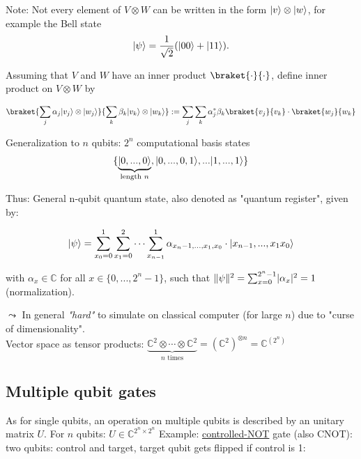 Note: Not every element of $V \otimes W$ can be written in the form $\lvert v\rangle \otimes \lvert w\rangle$,
for example the Bell state
\begin{equation*}
    \lvert\psi\rangle = \frac{1}{\sqrt{2}} (\lvert00\rangle + \lvert11\rangle).
\end{equation*}

Assuming that $V$ and $W$ have an inner product $\braket{\cdot}{\cdot}$, define inner product
on $V \otimes W$ by

\begin{equation}
    \braket{\sum_j \alpha_j \ket{v_j} \otimes \ket{w_j}}
        {\sum_k \beta_k \ket{v_k} \otimes \ket{w_k}} :=
    \sum_j \sum_k \alpha_j^* \beta_k \braket{v_j}{v_k}\cdot \braket{w_j}{w_k}
\end{equation}


Generalization to $n$ qubits: $2^n$ computational basis states
\begin{equation*}
    \{\underbrace{\lvert0, ..., 0\rangle}_{\text{length $n$}}, \lvert0, ..., 0, 1\rangle, ... \lvert1,...,1\rangle\}
\end{equation*}

Thus: General n-qubit quantum state, also denoted as "quantum register", given by:

\begin{equation}
    \lvert\psi\rangle = \sum_{x_0 = 0}^1 \sum_{x_1 = 0}^2 \cdots \sum_{x_{n-1}}^1 \alpha_{x_n-1,..., x_1, x_0}
        \cdot \lvert x_{n-1},..., x_1 x_0\rangle
\end{equation}

with $\alpha_x \in \mathbb{C}$ for all $x \in \{0, ..., 2^n - 1\}$, such that 
$\lVert\psi\rVert^2 = \sum_{x = 0}^{2^n - 1} \lvert\alpha_x\rvert^2 = 1$ (normalization).

$\leadsto$ In general \textit{"hard"} to simulate on classical computer (for large $n$) due to "curse of dimensionality". \\
Vector space as tensor products: 
$\underbrace{\mathbb{C}^2 \otimes \cdots \otimes \mathbb{C}^2}_{\text{$n$ times}} 
= (\mathbb{C}^2)^{\otimes n} = \mathbb{C}^{(2^n)}$

\subsection{Multiple qubit gates}

As for single qubits, an operation on multiple qubits is described by an unitary matrix $U$.
For $n$ qubits: $U \in \mathbb{C}^{2^n \times 2^n}$
\newpage
%
Example: \underline{controlled-NOT} gate (also CNOT): \\
two qubits: {\color{orange}control} and target, target qubit gets flipped if {\color{orange}control} is 1: \\

